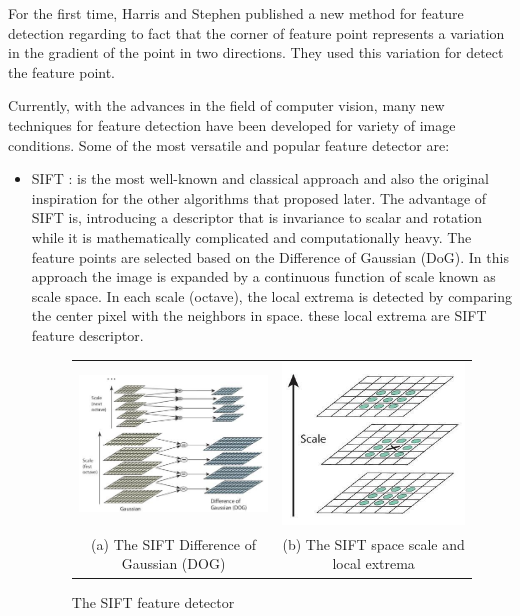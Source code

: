 For the first time, Harris and Stephen \cite{harris1988combined} published a new method for feature detection regarding to fact that the corner of feature point represents a variation in the gradient of the point in two directions. They used this variation for detect the feature point.

Currently, with the advances in the field of computer vision, many new techniques for feature detection have been developed for variety of image conditions. Some of the most versatile and popular feature detector are:
\begin{itemize}
\item SIFT \cite{lowe2004distinctive}: is the most well-known and classical approach and also the original inspiration for the other algorithms that proposed later. The advantage of SIFT is, introducing a descriptor that is invariance to scalar and rotation while it is mathematically complicated and computationally heavy. The feature points are selected based on the Difference of Gaussian (DoG). In this approach the image is expanded by a continuous function of scale known as scale space. In each scale (octave), the local extrema is detected by comparing the center pixel with the neighbors in space. these local extrema are SIFT feature descriptor.

\begin{figure}[H]
\begin{tabular}{cc}
  \includegraphics[width=60mm]{figures/sift_dog} &  \includegraphics[width=50mm]{figures/sift_scale} \\
(a) The SIFT Difference of Gaussian (DOG) & (b) The SIFT space scale and local extrema \\[6pt]
\end{tabular}
\caption{The SIFT feature detector} \label{fig:sift_detector}
\end{figure}



\end{itemize}
